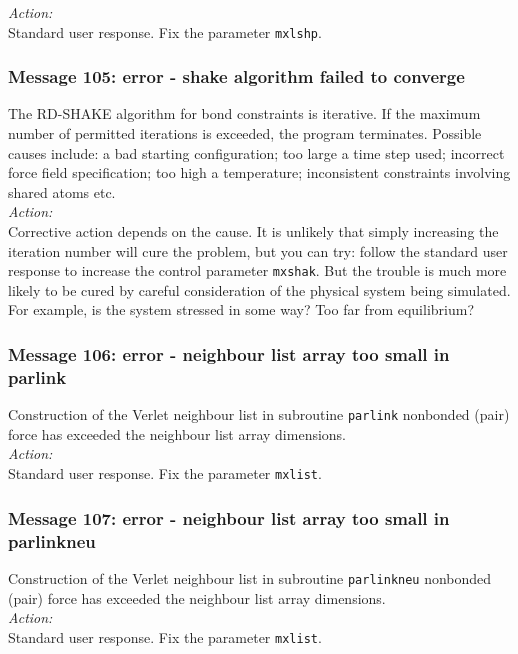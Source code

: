 \noindent
{\em Action:} \\ 
Standard user response. Fix the parameter {\tt mxlshp}.

\subsubsection*{Message 105: error - shake algorithm failed to converge}

The RD-SHAKE  algorithm for bond
constraints   is iterative. If the
maximum number of permitted iterations is exceeded, the program
terminates. Possible causes include: a bad starting configuration; too
large a time step used; incorrect force field  specification; too high
a temperature; inconsistent constraints involving shared atoms etc. \\ 

\noindent
{\em Action:} 
\\ Corrective action depends on
the cause. It is unlikely that simply increasing the iteration number
will cure the problem, but you can try: follow the standard user
response to increase the control parameter {\tt mxshak}. But the
trouble is much more likely to be cured by careful consideration of
the physical system being simulated. For example, is the system
stressed in some way? Too far from equilibrium?

\subsubsection*{Message 106: error - neighbour list array too small in
          parlink}

Construction of the Verlet neighbour list 
in subroutine {\tt parlink} nonbonded (pair) force has exceeded the
neighbour list array dimensions. \\

\noindent
{\em Action:} \\ 
Standard user response. Fix the parameter {\tt mxlist}.

\subsubsection*{Message 107: error - neighbour list array too small in
          parlinkneu}

Construction of the Verlet neighbour list 
in subroutine {\tt parlinkneu} nonbonded (pair) force has exceeded the
neighbour list array dimensions. \\

\noindent
{\em Action:} \\ 
Standard user response. Fix the parameter {\tt mxlist}.

